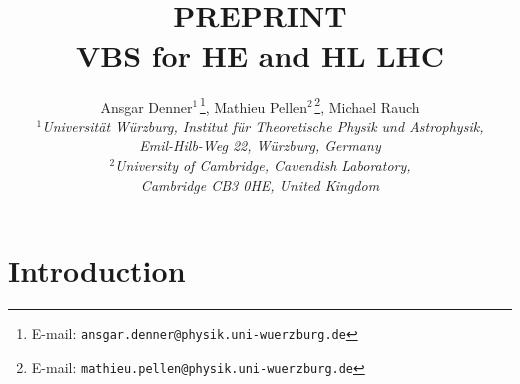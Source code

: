 \documentclass[11pt,epsf]{article}
\begin{document}
\title{\hfill ~\\[-30mm]
\phantom{h} \hfill\mbox{\small PREPRINT}
\\[1cm]
\vspace{13mm}   \textbf{VBS for HE and HL LHC}}

\date{}
\author{
Ansgar Denner$^{1\,}$\footnote{E-mail:
  \texttt{ansgar.denner@physik.uni-wuerzburg.de}},
Mathieu Pellen$^{2\,}$\footnote{E-mail:
  \texttt{mathieu.pellen@physik.uni-wuerzburg.de}},
Michael Rauch
\\[9mm]
{\small\it
$^1$Universit\"at W\"urzburg, %
        Institut f\"ur Theoretische Physik und Astrophysik,} \\ %
{\small\it Emil-Hilb-Weg 22,  W\"urzburg, %
        Germany}\\[3mm]
{\small\it
$^2$University of Cambridge, Cavendish Laboratory,} \\ %
{\small\it Cambridge CB3 0HE, United Kingdom}\\[3mm]
}

\maketitle

\begin{abstract}
\noindent

\end{abstract}
\thispagestyle{empty}
\vfill
\newpage
\setcounter{page}{1}

\tableofcontents
\newpage


\section{Introduction}
\end{document}
